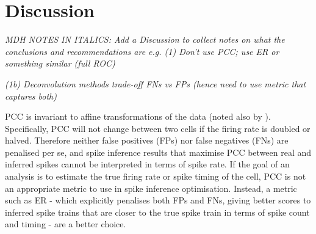 \documentclass[a4paper,10pt,twocolumn]{article}
\begin{document}








\newpage
\section{Discussion}
\emph{MDH NOTES IN ITALICS: Add a Discussion to collect notes on what the conclusions and recommendations are e.g. (1) Don’t use PCC; use ER or something similar (full ROC)}

\emph{(1b) Deconvolution methods trade-off FNs vs FPs (hence need to use metric that captures both)}

PCC is invariant to affine transformations of the data (noted also by \citep{Theis2016-ee}). Specifically, PCC will not change between two cells if the firing rate is doubled or halved. Therefore neither false positives (FPs) nor false negatives (FNs) are penalised per se, and spike inference results that maximise PCC between real and inferred spikes cannot be interpreted in terms of spike rate. If the goal of an analysis is to estimate the true firing rate or spike timing of the cell, PCC is not an appropriate metric to use in spike inference optimisation. Instead, a metric such as ER - which explicitly penalises both FPs and FNs, giving better scores to inferred spike trains that are closer to the true spike train in terms of spike count and timing - are a better choice.\\
\end{document}
